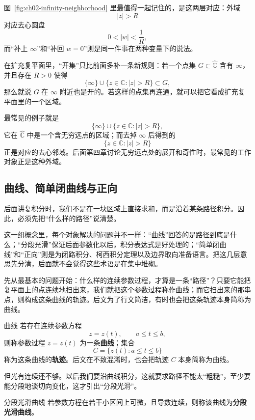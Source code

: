 图~\ref{fig:ch02-infinity-neighborhood} 里最值得一起记住的，是这两层对应：外域
\[
    |z|>R
\]
对应去心圆盘
\[
    0<|w|<\frac{1}{R},
\]
而``补上 $\infty$''和``补回 $w=0$''则是同一件事在两种变量下的说法。

\begin{tishi}[含无穷远点的区域怎样理解]
在扩充复平面里，``开集''只比前面多补一条新规则：若一个点集 $G\subset\hat{\mathbb{C}}$ 含有 $\infty$，并且存在 $R>0$ 使得
\[
    \{\infty\}\cup\{z\in\mathbb{C}:|z|>R\}\subset G,
\]
那么就说 $G$ 在 $\infty$ 附近也是开的。若这样的点集再连通，就可以把它看成扩充复平面里的一个区域。

最常见的例子就是
\[
    \{\infty\}\cup\{z\in\mathbb{C}:|z|>R\},
\]
它在 $\hat{\mathbb{C}}$ 中是一个含无穷远点的区域；而去掉 $\infty$ 后得到的
\[
    \{z\in\mathbb{C}:|z|>R\}
\]
正是对应的去心邻域。后面第四章讨论无穷远点处的展开和奇性时，最常见的工作对象正是这种外域。
\end{tishi}

\subsection{曲线、简单闭曲线与正向}

后面讲复积分时，我们不是在一块区域上直接求和，而是沿着某条路径积分。因此，必须先把``什么样的路径''说清楚。

这一组概念里，每个对象解决的问题并不一样：``曲线''回答的是路径到底是什么；``分段光滑''保证后面参数化以后，积分表达式是好处理的；``简单闭曲线''和``正向''则是为闭路积分、柯西积分定理以及边界取向准备语言。把这几层意思先分清，后面就不会觉得这些术语是在集中堆砌。

\noindent 先从最基本的问题开始：什么样的连续参数过程，才算是一条``路径''？只要它能把复平面上的点连续地扫出来，我们就把这个参数过程称作曲线；而它扫出来的那串点，则构成这条曲线的轨迹。后文为了行文简洁，有时也会把这条轨迹本身简称为曲线。

\begin{dingliyi}{曲线}{}
若存在连续参数方程
\[
    z=z(t),\qquad a\le t\le b,
\]
则称参数过程 $z=z(t)$ 为一条\textbf{曲线}；集合
\[
    C=\{z(t):a\le t\le b\}
\]
称为这条曲线的\textbf{轨迹}。后文在不致混淆时，也会把轨迹 $C$ 本身简称为曲线。
\end{dingliyi}

\noindent 但光有连续还不够。以后我们要沿曲线积分，这就要求路径不能太``粗糙''，至少要能分段地谈切向变化，这才引出``分段光滑''。

\begin{dingliyi}{分段光滑曲线}{}
若参数方程在若干小区间上可微，且导数连续，则称该曲线为\textbf{分段光滑曲线}。
\end{dingliyi}

